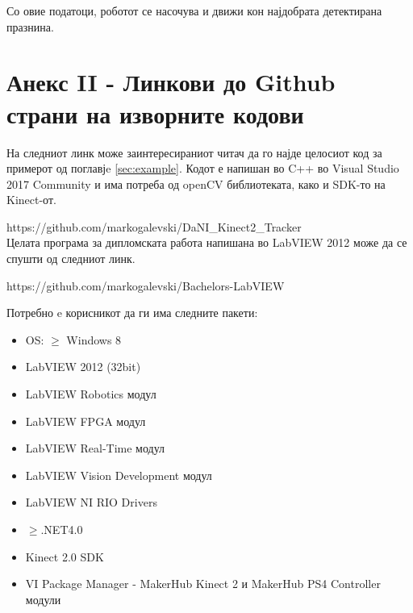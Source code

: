\documentclass[11pt]{article}
\begin{document}
  Со овие податоци, роботот се насочува и движи кон најдобрата детектирана празнина.

\newpage

\section{Анекс II - Линкови до Github страни на изворните кодови}
    На следниот линк може заинтересираниот читач да го најде целосиот код за примерот од поглавјe \ref{sec:example}. Кодот е напишан во C++ во Visual Studio 2017 Community и има потреба од openCV библиотеката, како и SDK-то на Kinect-от.

    https://github.com/markogalevski/DaNI\_Kinect2\_Tracker
    \\
    Целата програма за дипломската работа напишана во LabVIEW 2012 може да се спушти од следниот линк.

    https://github.com/markogalevski/Bachelors-LabVIEW

    Потребно e корисникот да ги има следните пакети:
    \begin{itemize}
      \item OS: $\geq$ Windows 8
      \item LabVIEW 2012 (32bit)
      \item LabVIEW Robotics модул
      \item LabVIEW FPGA модул
      \item LabVIEW Real-Time модул
      \item LabVIEW Vision Development модул
      \item LabVIEW NI RIO Drivers
      \item $\geq$.NET4.0
      \item Kinect 2.0 SDK
      \item VI Package Manager - MakerHub Kinect 2 и MakerHub PS4 Controller модули
      \end{itemize}

\medskip
\nocite{*}

\newpage

\printbibliography[heading=bibintoc,title={Користена литература}]
\end{document}
